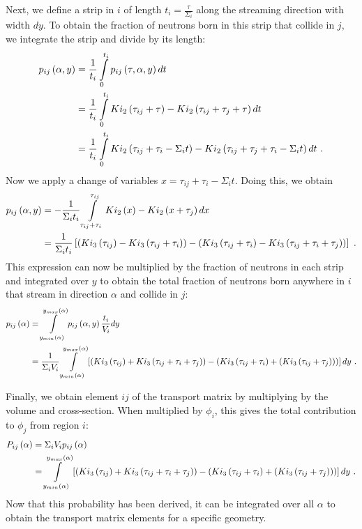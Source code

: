 Next, we define a strip in $i$ of length $t_i = \frac{\tau}{\Sigma_i}$ along the streaming direction with width $dy$.  To obtain the fraction of neutrons born in this strip that collide in $j$, we integrate the strip and divide by its length:
\begin{align}
p_{ij}\left(\alpha, y\right) &= \frac{1}{t_i} \intop_0^{t_i} p_{ij}\left(\tau, \alpha, y\right) dt \nonumber \\
&= \frac{1}{t_i} \intop_0^{t_i} Ki_2\left(\tau_{ij} + \tau\right) - Ki_2\left(\tau_{ij} + \tau_j + \tau\right) dt \nonumber \\
&= \frac{1}{t_i} \intop_0^{t_i} Ki_2\left(\tau_{ij} + \tau_i - \Sigma_i t\right) - Ki_2\left(\tau_{ij} + \tau_j + \tau_i - \Sigma_i t\right) dt\ .
\end{align}
Now we apply a change of variables $x=\tau_{ij} + \tau_i - \Sigma_i t$.  Doing this, we obtain
\begin{align}
p_{ij}\left(\alpha, y\right) &= -\frac{1}{\Sigma_i t_i} \intop_{\tau_{ij} + \tau_i}^{\tau_{ij}} Ki_2\left(x\right) - Ki_2\left(x + \tau_j\right) dx \nonumber \\
&= \frac{1}{\Sigma_i t_i} \left[\left(Ki_3\left(\tau_{ij}\right) - Ki_3\left(\tau_{ij} + \tau_i\right)\right) - \left(Ki_3\left(\tau_{ij} + \tau_i\right) - Ki_3\left(\tau_{ij} + \tau_i + \tau_j\right)\right)\right]\ .
\end{align}
This expression can now be multiplied by the fraction of neutrons in each strip and integrated over $y$ to obtain the total fraction of neutrons born anywhere in $i$ that stream in direction $\alpha$ and collide in $j$:
\begin{align}
p_{ij}\left(\alpha\right) &= \intop_{y_{min}\left(\alpha\right)}^{y_{max}\left(\alpha\right)} p_{ij}\left(\alpha,y\right) \frac{t_i}{V_i} dy \nonumber\\
&= \frac{1}{\Sigma_i V_i} \intop_{y_{min}\left(\alpha\right)}^{y_{max}\left(\alpha\right)} \left[\left(Ki_3\left(\tau_{ij}\right) + Ki_3\left(\tau_{ij} + \tau_i + \tau_j\right)\right) - \left(Ki_3\left(\tau_{ij} + \tau_i\right) + \left(Ki_3\left(\tau_{ij} + \tau_j\right)\right)\right)\right] dy\ .
\end{align}

Finally, we obtain element $ij$ of the transport matrix by multiplying by the volume and cross-section.  When multiplied by $\phi_i$, this gives the total contribution to $\phi_j$ from region $i$:
\begin{align}\label{e:CPPij}
P_{ij}\left(\alpha\right) &= \Sigma_i V_i p_{ij}\left(\alpha\right) \nonumber \\
&= \intop_{y_{min}\left(\alpha\right)}^{y_{max}\left(\alpha\right)} \left[\left(Ki_3\left(\tau_{ij}\right) + Ki_3\left(\tau_{ij} + \tau_i + \tau_j\right)\right) - \left(Ki_3\left(\tau_{ij} + \tau_i\right) + \left(Ki_3\left(\tau_{ij} + \tau_j\right)\right)\right)\right] dy\ .
\end{align}
Now that this probability has been derived, it can be integrated over all $\alpha$ to obtain the transport matrix elements for a specific geometry.

